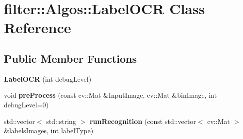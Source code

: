 \hypertarget{classfilter_1_1_algos_1_1_label_o_c_r}{}\section{filter\+:\+:Algos\+:\+:Label\+O\+CR Class Reference}
\label{classfilter_1_1_algos_1_1_label_o_c_r}
\subsection*{Public Member Functions}
\begin{DoxyCompactItemize}
\item 
\mbox{\label{classfilter_1_1_algos_1_1_label_o_c_r_a81f7df91e63f4b978ec8c945355b89ac}} 
{\bfseries Label\+O\+CR} (int debug\+Level)
\item 
\mbox{\label{classfilter_1_1_algos_1_1_label_o_c_r_abc434c1d9e7ba21482270bfef67d042d}} 
void {\bfseries pre\+Process} (const cv\+::\+Mat \&Input\+Image, cv\+::\+Mat \&bin\+Image, int debug\+Level=0)
\item 
\mbox{\label{classfilter_1_1_algos_1_1_label_o_c_r_a96f17c5c0afdde5c2212fdaa58fa75d6}} 
std\+::vector$<$ std\+::string $>$ {\bfseries run\+Recognition} (const std\+::vector$<$ cv\+::\+Mat $>$ \&labels\+Images, int label\+Type)
\end{DoxyCompactItemize}
